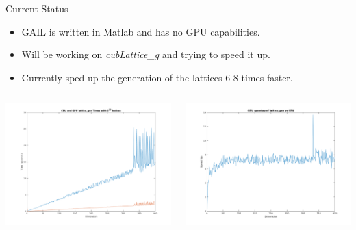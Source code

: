 \documentclass[11pt]{beamer}
\begin{document}
\begin{frame}{Current Status}
\begin{itemize}
\item GAIL is written in Matlab and has no GPU capabilities.
\item Will be working on \textit{cubLattice\_g} and trying to speed it up. 
\item Currently sped up the generation of the lattices 6-8 times faster.
\end{itemize}
\end{frame}

\begin{frame}
\centering
\begin{columns}
\centering
\includegraphics[width=\textwidth]{cpu_and_gpu_lattice_gen_times.png}

\centering
\includegraphics[width=\textwidth]{lattice_gen_speedup.png}  
\end{columns}
\end{frame}
\end{document}
